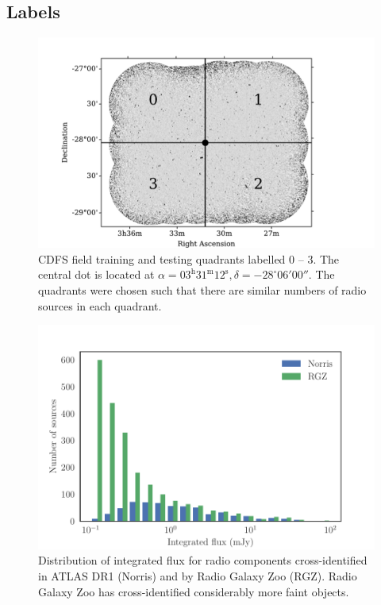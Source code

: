 \documentclass[fleqn,usenatbib,usedcolumn]{mnras}
\begin{document}
  \subsection{Labels}\label{sec:labels}
    \begin{figure}
      \centering
      \includegraphics[width=\columnwidth]{images/quadrants.pdf}
      \caption{CDFS field training and testing quadrants labelled 0 -- 3. The
        central dot is located at $\alpha = 03^\text{h}31^\text{m}12^\text{s},
        \delta = -28^\circ{}06'00''$. The quadrants were chosen such that
        there are similar numbers of radio sources in each
        quadrant.\label{fig:quadrants}}
    \end{figure}

    \begin{figure}
      \centering
      \includegraphics[width=\columnwidth]{images/flux_histogram.pdf}
      \caption{Distribution of integrated flux for radio components
        cross-identified in ATLAS DR1 (Norris) and by Radio Galaxy Zoo (RGZ).
        Radio Galaxy Zoo has cross-identified considerably more faint
        objects.}
      \label{fig:distribution-fluxes}
    \end{figure}
\end{document}
